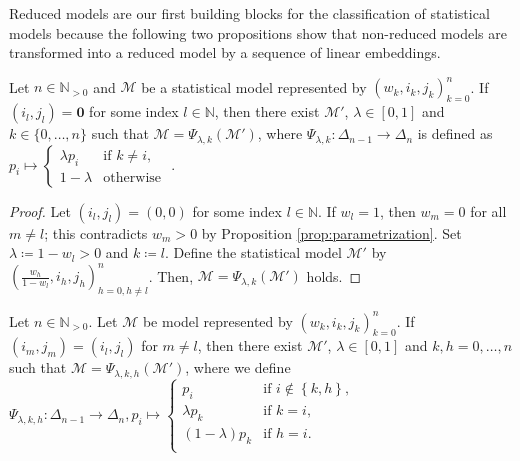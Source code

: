 Reduced models are our first building blocks for the classification of statistical models because the following two propositions show that non-reduced models are transformed into a reduced model by a sequence of linear embeddings.

\begin{proposition}\label{prop:linear-embedding-1}
    Let \( n \in \mathbb{N}_{>0} \) and \( \mathcal{M} \) be a statistical model represented by \( (w_k, i_k, j_k)_{k=0}^n \). If \( (i_l, j_l) = \mathbf{0} \) for some index \( l \in \mathbb{N} \), then there exist \( \mathcal{M}' \), \( \lambda \in [0,1] \) and \( k \in \{ 0, \dots, n \} \) such that \( \mathcal{M} = \Psi_{\lambda,k}(\mathcal{M}') \), where \( \Psi_{\lambda, k}: \Delta_{n-1} \to \Delta_n \) is defined as \(  p_i \mapsto \begin{cases}
        \lambda p_i & \text{if } k \neq i, \\
        1-\lambda & \text{otherwise }
    \end{cases} \).
\end{proposition}

\begin{proof}
    Let \( (i_l, j_l) = (0,0) \) for some index \( l \in \mathbb{N} \). If \( w_l = 1 \), then \( w_m = 0 \) for all \( m \neq l \); this contradicts \( w_m > 0 \) by Proposition \ref{prop:parametrization}. Set \( \lambda \coloneqq 1 - w_l > 0 \) and \( k \coloneqq l \). Define the statistical model \( \mathcal{M}' \) by \( \left(\frac{w_h}{1-w_l}, i_h, j_h\right)^n_{h=0, h \neq l} \).
    Then, \( \mathcal{M} = \Psi_{\lambda,k}(\mathcal{M}') \) holds.
\end{proof}

\begin{proposition}\label{prop:linear-embedding-2}
    Let \( n \in \mathbb{N}_{>0} \).
    Let \( \mathcal{M} \) be model represented by \( (w_k, i_k, j_k)_{k=0}^n \). If \( (i_m, j_m) = (i_l, j_l)  \) for \( m \neq l \), then there exist \( \mathcal{M}' \), \( \lambda \in [0,1] \) and \( k,h = 0, \dots, n \) such that \( \mathcal{M} = \Psi_{\lambda,k,h}(\mathcal{M}') \), 
    where we define \( \Psi_{\lambda, k,h}: \Delta_{n-1} \to \Delta_n,  p_i \mapsto \begin{cases}
         p_i & \text{if } i \notin \left\{ k,h \right\}, \\
        \lambda p_k & \text{if } k = i, \\
        (1-\lambda) p_k & \text{if } h = i. \\
    \end{cases} \)
\end{proposition}

